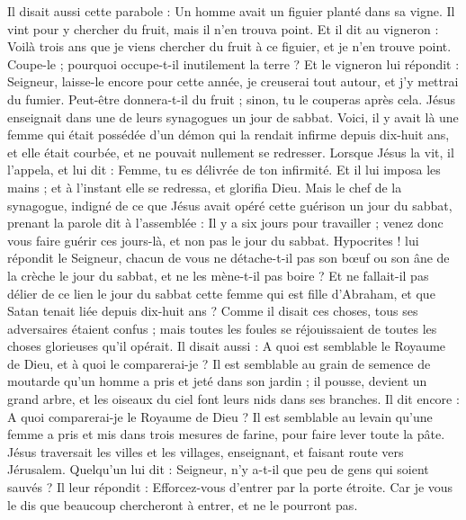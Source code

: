\begin{multicols}{2}
Il disait aussi cette parabole : Un homme avait un figuier planté dans sa vigne. Il vint pour y chercher du fruit, mais il n’en trouva point.
Et il dit au vigneron : Voilà trois ans que je viens chercher du fruit à ce figuier, et je n’en trouve point. Coupe-le ; pourquoi occupe-t-il inutilement la terre ?
Et le vigneron lui répondit : Seigneur, laisse-le encore pour cette année, je creuserai tout autour, et j’y mettrai du fumier.
Peut-être donnera-t-il du fruit ; sinon, tu le couperas après cela.
Jésus enseignait dans une de leurs synagogues un jour de sabbat.
Voici, il y avait là une femme qui était possédée d'un démon qui la rendait infirme depuis dix-huit ans, et elle était courbée, et ne pouvait nullement se redresser.
Lorsque Jésus la vit, il l'appela, et lui dit : Femme, tu es délivrée de ton infirmité.
Et il lui imposa les mains ; et à l’instant elle se redressa, et glorifia Dieu.
Mais le chef de la synagogue, indigné de ce que Jésus avait opéré cette guérison un jour du sabbat, prenant la parole dit à l'assemblée : Il y a six jours pour travailler ; venez donc vous faire guérir ces jours-là, et non pas le jour du sabbat.
Hypocrites ! lui répondit le Seigneur, chacun de vous ne détache-t-il pas son bœuf ou son âne de la crèche le jour du sabbat, et ne les mène-t-il pas boire ?
Et ne fallait-il pas délier de ce lien le jour du sabbat cette femme qui est fille d'Abraham, et que Satan tenait liée depuis dix-huit ans ?
Comme il disait ces choses, tous ses adversaires étaient confus ; mais toutes les foules se réjouissaient de toutes les choses glorieuses qu'il opérait.
Il disait aussi : A quoi est semblable le Royaume de Dieu, et à quoi le comparerai-je ?
Il est semblable au grain de semence de moutarde qu'un homme a pris et jeté dans son jardin ; il pousse, devient un grand arbre, et les oiseaux du ciel font leurs nids dans ses branches.
Il dit encore : A quoi comparerai-je le Royaume de Dieu ?
Il est semblable au levain qu'une femme a pris et mis dans trois mesures de farine, pour faire lever toute la pâte.
Jésus traversait les villes et les villages, enseignant, et faisant route vers Jérusalem.
Quelqu’un lui dit : Seigneur, n'y a-t-il que peu de gens qui soient sauvés ? Il leur répondit :
Efforcez-vous d’entrer par la porte étroite. Car je vous le dis que beaucoup chercheront à entrer, et ne le pourront pas.

\end{multicols}
